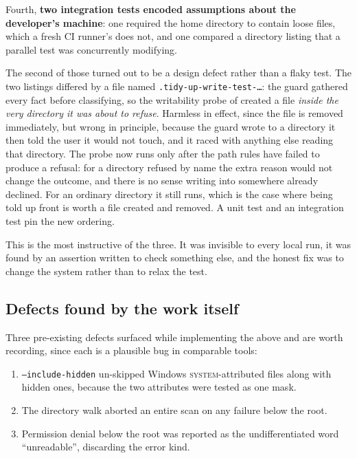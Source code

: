 \documentclass[11pt,a4paper]{article}
\newcommand{\code}[1]{\texttt{\small #1}}
\begin{document}
Fourth, \textbf{two integration tests encoded assumptions about the developer's
machine}: one required the home directory to contain loose files, which a fresh CI
runner's does not, and one compared a directory listing that a parallel test was
concurrently modifying.

The second of those turned out to be a design defect rather than a flaky test. The
two listings differed by a file named \code{.tidy-up-write-test-\ldots}: the guard
gathered every fact before classifying, so the writability probe of 
created a file \emph{inside the very directory it was about to refuse}. Harmless in
effect, since the file is removed immediately, but wrong in principle, because the
guard wrote to a directory it then told the user it would not touch, and it raced
with anything else reading that directory. The probe now runs only after the path
rules have failed to produce a refusal: for a directory refused by name the extra
reason would not change the outcome, and there is no sense writing into somewhere
already declined. For an ordinary directory it still runs, which is the case where
being told up front is worth a file created and removed. A unit test and an
integration test pin the new ordering.

This is the most instructive of the three. It was invisible to every local run, it
was found by an assertion written to check something else, and the honest fix was to
change the system rather than to relax the test.

\subsection{Defects found by the work itself}

Three pre-existing defects surfaced while implementing the above and are worth
recording, since each is a plausible bug in comparable tools:

\begin{enumerate}[leftmargin=1.6em,itemsep=0.2em]
  \item \code{--include-hidden} un-skipped Windows \textsc{system}-attributed files
    along with hidden ones, because the two attributes were tested as one mask.
  \item The directory walk aborted an entire scan on any failure below the root.
  \item Permission denial below the root was reported as the undifferentiated word
    \enquote{unreadable}, discarding the error kind.
\end{enumerate}
\end{document}
